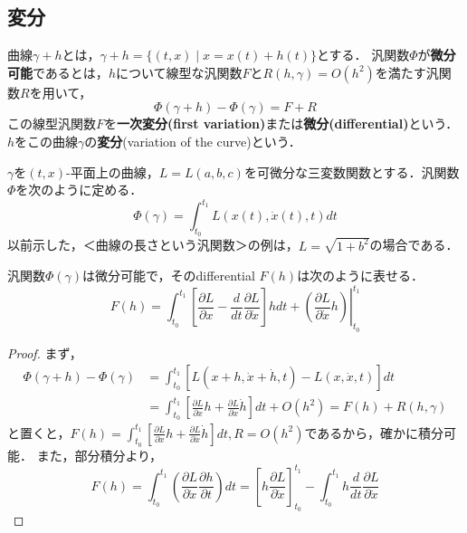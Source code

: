 \documentclass[uplatex, 12pt, dvipdfmx]{jsreport}
\begin{document}
\subsection{変分}

\begin{definition}
    曲線$\gamma+h$とは，$\gamma+h=\{(t,x)\mid x=x(t)+h(t)\}$とする．
    汎関数$\Phi$が\textbf{微分可能}であるとは，$h$について線型な汎関数$F$と$R(h,\gamma)=O(h^2)$を満たす汎関数$R$を用いて，
    \[ \Phi(\gamma+h)-\Phi(\gamma) = F+R \]
    この線型汎関数$F$を\textbf{一次変分(first variation)}または\textbf{微分(differential)}という．$h$をこの曲線$\gamma$の\textbf{変分}(variation of the curve)という．
\end{definition}
\begin{example}
    $\gamma$を$(t,x)$-平面上の曲線，$L=L(a,b,c)$を可微分な三変数関数とする．汎関数$\Phi$を次のように定める．
    \[ \Phi(\gamma) = \int^{t_1}_{t_0}L(x(t),\dot{x}(t),t)dt \]
    以前示した，＜曲線の長さという汎関数＞の例は，$L=\sqrt{1+b^2}$の場合である．
\end{example}

\begin{theorem}\label{thm-differential-of-action-functional}
    汎関数$\Phi(\gamma)$は微分可能で，そのdifferential $F(h)$は次のように表せる．
    \[ F(h) = \int^{t_1}_{t_0}\left.\left[ \frac{\partial L}{\partial x}-\frac{d}{dt}\frac{\partial L}{\partial\dot{x}} \right]hdt+\left(\frac{\partial L}{\partial\dot{x}}h\right) \right|^{t_1}_{t_0} \]
\end{theorem}
\begin{proof}
    まず，
    \begin{align*}
        \Phi(\gamma+h)-\Phi(\gamma) &= \int^{t_1}_{t_0}\left[L(x+h,\dot{x}+\dot{h},t)-L(x,\dot{x},t)\right]dt\\
        &= \int^{t_1}_{t_0}\left[\frac{\partial L}{\partial x}h+\frac{\partial L}{\partial\dot{x}}\dot{h}\right]dt + O(h^2) = F(h) + R(h,\gamma)
    \end{align*}
    と置くと，$F(h)=\int^{t_1}_{t_0}\left[\frac{\partial L}{\partial x}h+\frac{\partial L}{\partial\dot{x}}\dot{h}\right]dt, R=O(h^2)$であるから，確かに積分可能．
    また，部分積分より，
    \[ F(h) = \int^{t_1}_{t_0}\left( \frac{\partial L}{\partial\dot{x}}\frac{\partial h}{\partial t} \right)dt = \left[ h\frac{\partial L}{\partial\dot{x}} \right]^{t_1}_{t_0} - \int^{t_1}_{t_0} h\frac{d}{dt}\frac{\partial L}{\partial\dot{x}} \]
\end{proof}
\end{document}
